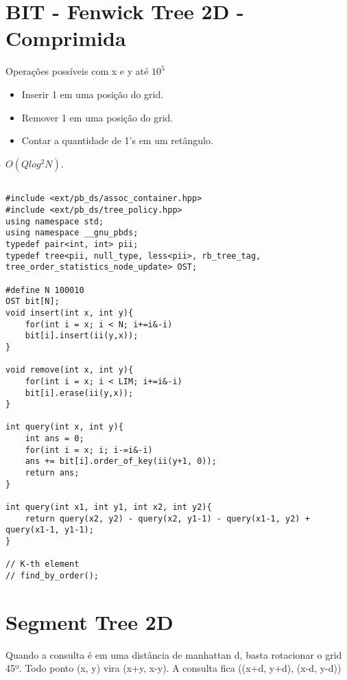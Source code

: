 \section{BIT - Fenwick Tree 2D - Comprimida}

Operações possíveis com x e y até $10^5$
\begin{itemize}
\itemsep0em
\item Inserir 1 em uma posição do grid.
\item Remover 1 em uma posição do grid.
\item Contar a quantidade de 1's em um retângulo.
\end{itemize}

$O(Qlog^2N)$.


\begin{multicols}{2}
	\begin{lstlisting}

#include <ext/pb_ds/assoc_container.hpp>
#include <ext/pb_ds/tree_policy.hpp>
using namespace std;
using namespace __gnu_pbds;
typedef pair<int, int> pii;
typedef tree<pii, null_type, less<pii>, rb_tree_tag, tree_order_statistics_node_update> OST;

#define N 100010
OST bit[N];
void insert(int x, int y){
	for(int i = x; i < N; i+=i&-i)
	bit[i].insert(ii(y,x));
}

void remove(int x, int y){
	for(int i = x; i < LIM; i+=i&-i)
	bit[i].erase(ii(y,x));
}

int query(int x, int y){
	int ans = 0;
	for(int i = x; i; i-=i&-i)
	ans += bit[i].order_of_key(ii(y+1, 0));
	return ans;
}

int query(int x1, int y1, int x2, int y2){
	return query(x2, y2) - query(x2, y1-1) - query(x1-1, y2) + query(x1-1, y1-1);
}

// K-th element
// find_by_order();

\end{lstlisting}
\end{multicols}

\section{Segment Tree 2D}

Quando a consulta é em uma distância de manhattan d, basta rotacionar o grid 45º.
Todo ponto (x, y) vira (x+y, x-y).
A consulta fica ((x+d, y+d), (x-d, y-d))

